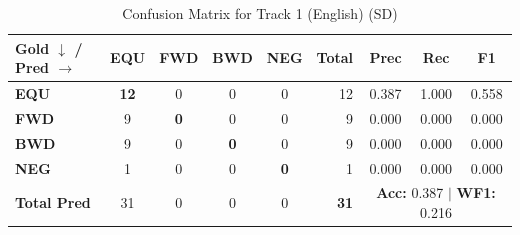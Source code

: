 \begin{table}[ht]
\centering
\small
\begin{tabular}{l|cccc|r|ccc}
\toprule
\textbf{Gold $\downarrow$ / Pred $\rightarrow$} & \textbf{EQU} & \textbf{FWD} & \textbf{BWD} & \textbf{NEG} & \textbf{Total} & \textbf{Prec} & \textbf{Rec} & \textbf{F1} \\
\midrule
\textbf{EQU} & \textbf{12} & 0 & 0 & 0 & 12 & 0.387 & 1.000 & 0.558 \\
\textbf{FWD} & 9 & \textbf{0} & 0 & 0 & 9 & 0.000 & 0.000 & 0.000 \\
\textbf{BWD} & 9 & 0 & \textbf{0} & 0 & 9 & 0.000 & 0.000 & 0.000 \\
\textbf{NEG} & 1 & 0 & 0 & \textbf{0} & 1 & 0.000 & 0.000 & 0.000 \\
\midrule
\textbf{Total Pred} & 31 & 0 & 0 & 0 & \textbf{31} & \multicolumn{3}{c}{\textbf{Acc:} 0.387 $\mid$ \textbf{WF1:} 0.216} \\
\bottomrule
\end{tabular}
\caption{Confusion Matrix for Track 1 (English) (SD)}
\label{tab:confusion_matrix}
\end{table}